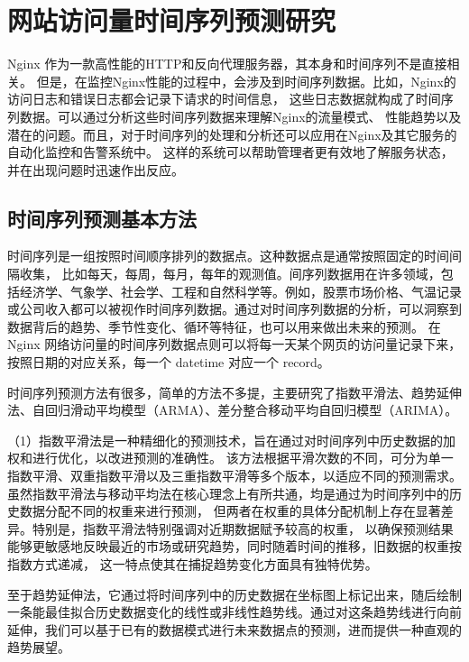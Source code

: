 \chapter{网站访问量时间序列预测研究}

Nginx 作为一款高性能的HTTP和反向代理服务器，其本身和时间序列不是直接相关。
但是，在监控Nginx性能的过程中，会涉及到时间序列数据。比如，Nginx的访问日志和错误日志都会记录下请求的时间信息，
这些日志数据就构成了时间序列数据。可以通过分析这些时间序列数据来理解Nginx的流量模式、
性能趋势以及潜在的问题。而且，对于时间序列的处理和分析还可以应用在Nginx及其它服务的自动化监控和告警系统中。
这样的系统可以帮助管理者更有效地了解服务状态，并在出现问题时迅速作出反应。

\section{时间序列预测基本方法}

时间序列是一组按照时间顺序排列的数据点。这种数据点是通常按照固定的时间间隔收集，
比如每天，每周，每月，每年的观测值。间序列数据用在许多领域，包括经济学、气象学、社会学、工程和自然科学等。例如，股票市场价格、气温记录或公司收入都可以被视作时间序列数据。通过对时间序列数据的分析，可以洞察到数据背后的趋势、季节性变化、循环等特征，也可以用来做出未来的预测。
在 Nginx 网络访问量的时间序列数据点则可以将每一天某个网页的访问量记录下来，按照日期的对应关系，每一个 datetime 对应一个 record。

时间序列预测方法有很多，简单的方法不多提，主要研究了指数平滑法、趋势延伸法、自回归滑动平均模型（ARMA）、差分整合移动平均自回归模型（ARIMA）。

（1）指数平滑法是一种精细化的预测技术，旨在通过对时间序列中历史数据的加权和进行优化，以改进预测的准确性。
该方法根据平滑次数的不同，可分为单一指数平滑、双重指数平滑以及三重指数平滑等多个版本，以适应不同的预测需求。
虽然指数平滑法与移动平均法在核心理念上有所共通，均是通过为时间序列中的历史数据分配不同的权重来进行预测，
但两者在权重的具体分配机制上存在显著差异。特别是，指数平滑法特别强调对近期数据赋予较高的权重，
以确保预测结果能够更敏感地反映最近的市场或研究趋势，同时随着时间的推移，旧数据的权重按指数方式递减，
这一特点使其在捕捉趋势变化方面具有独特优势。

至于趋势延伸法，它通过将时间序列中的历史数据在坐标图上标记出来，随后绘制一条能最佳拟合历史数据变化的线性或非线性趋势线。通过对这条趋势线进行向前延伸，我们可以基于已有的数据模式进行未来数据点的预测，进而提供一种直观的趋势展望。

